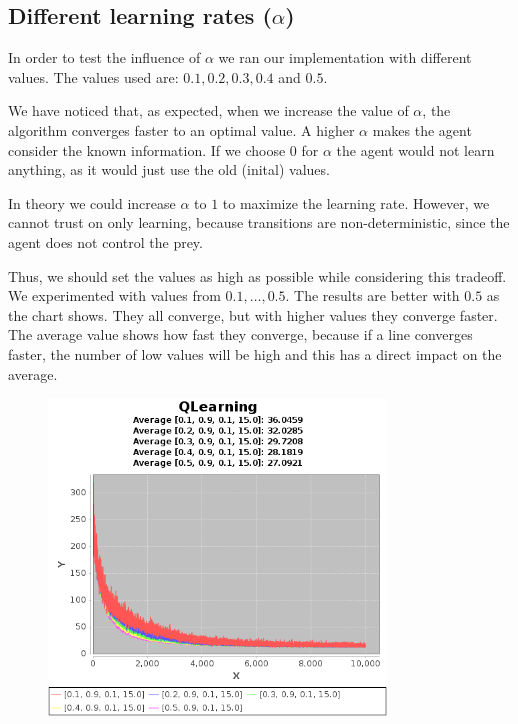 \documentclass{article}
\begin{document}
\subsection{Different learning rates ($\alpha$)}
In order to test the influence of $\alpha$ we ran our implementation with
different values. The values used are:
$0.1 , 0.2, 0.3, 0.4$ and $0.5$. 

We have noticed that, as expected, when we increase the value of $\alpha$, the 
algorithm converges faster to an optimal value. A higher $\alpha$  makes the agent
consider the known information. If we choose $0$ for $\alpha$ the agent
would not learn anything, as it would just use the old (inital) values.

In theory we could increase $\alpha$ to $1$ to maximize the learning rate. However, we cannot trust on only learning, because transitions are non-deterministic, since the agent does not control the prey.

Thus, we should set the values as high as possible while considering this tradeoff.
We experimented with values from $0.1, \ldots , 0.5$. The results are
better with $0.5$ as the chart shows. They all converge, but with higher values
they converge faster. The average value shows how fast they converge, because if
a line converges faster, the number of low values will be high and this has a
direct impact on the average.

\begin{figure}[htbp]
\centering
\includegraphics[width=0.8\textwidth]{res/alpha_01_to_05_gama_09_epsilon_01_IV_15.png}
\end{figure}
\end{document}
